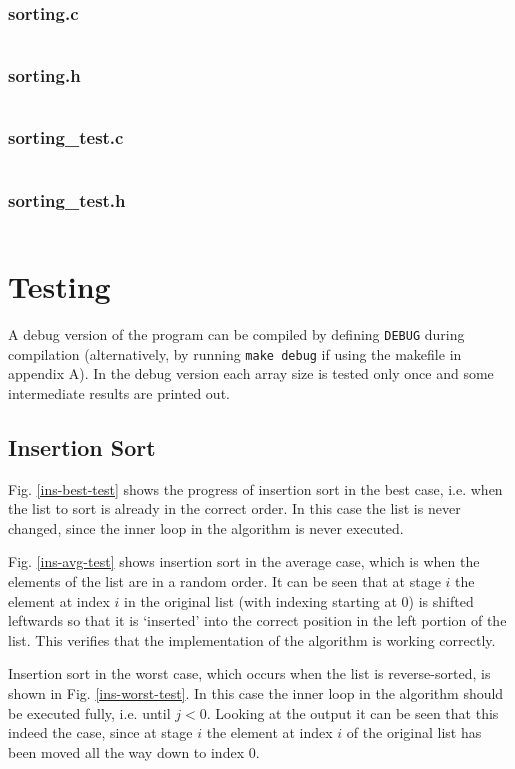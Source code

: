 \documentclass{article}
\begin{document}
\subsubsection{sorting.c}
\inputminted{c}{alg-cw1/src/sorting.c}

\subsubsection{sorting.h}
\inputminted{c}{alg-cw1/src/sorting.h}

\subsubsection{sorting\_test.c}
\inputminted{c}{alg-cw1/src/sorting_test.c}

\subsubsection{sorting\_test.h}
\inputminted{c}{alg-cw1/src/sorting_test.h}

\section{Testing}

A debug version of the program can be compiled by defining \texttt{DEBUG} during compilation (alternatively, by running \texttt{make debug} if using the makefile in appendix A). In the debug version each array size is tested only once and some intermediate results are printed out.

\subsection{Insertion Sort}

Fig. \ref{ins-best-test} shows the progress of insertion sort in the best case, i.e. when the list to sort is already in the correct order. In this case the list is never changed, since the inner loop in the algorithm is never executed.

Fig. \ref{ins-avg-test} shows insertion sort in the average case, which is when the elements of the list are in a random order. It can be seen that at stage $i$ the element at index $i$ in the original list (with indexing starting at 0) is shifted leftwards so that it is `inserted' into the correct position in the left portion of the list. This verifies that the implementation of the algorithm is working correctly.

Insertion sort in the worst case, which occurs when the list is reverse-sorted, is shown in Fig. \ref{ins-worst-test}. In this case the inner loop in the algorithm should be executed fully, i.e. until $j < 0$. Looking at the output it can be seen that this indeed the case, since at stage $i$ the element at index $i$ of the original list has been moved all the way down to index 0.
\end{document}
